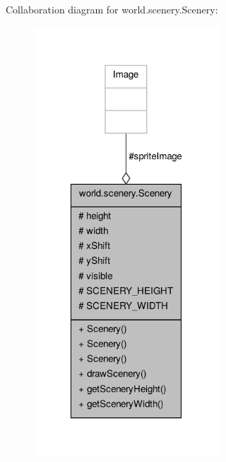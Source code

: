Collaboration diagram for world.\-scenery.\-Scenery\-:\nopagebreak
\begin{figure}[H]
\begin{center}
\leavevmode
\includegraphics[width=198pt]{classworld_1_1scenery_1_1_scenery__coll__graph}
\end{center}
\end{figure}
